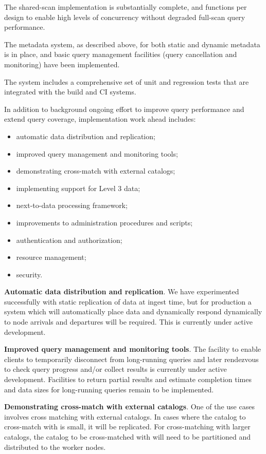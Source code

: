 \documentclass[DM,lsstdraft,toc]{lsstdoc}
\begin{document}
The shared-scan implementation is substantially complete, and functions per
design to enable high levels of concurrency without degraded full-scan query
performance.

The metadata system, as described above, for both static and dynamic metadata
is in place, and basic query management facilities (query cancellation and
monitoring) have been implemented.

The system includes a comprehensive set of unit and regression tests that are
integrated with the build and CI systems.

In addition to background ongoing effort to improve query performance and
extend query coverage, implementation work ahead includes:

\begin{itemize}
\item
  automatic data distribution and replication;
\item
  improved query management and monitoring tools;
\item
  demonstrating cross-match with external catalogs;
\item
  implementing support for Level 3 data;
\item
  next-to-data processing framework;
\item
  improvements to administration procedures and scripts;
\item
  authentication and authorization;
\item
  resource management;
\item
  security.
\end{itemize}

\textbf{Automatic data distribution and replication}. We have experimented
successfully with static replication of data at ingest time, but for
production a system which will automatically place data and dynamically
respond dynamically to node arrivals and departures will be required.
This is currently under active development.

\textbf{Improved query management and monitoring tools}. The facility to
enable clients to temporarily disconnect from long-running queries and later
rendezvous to check query progress and/or collect results is currently under
active development.  Facilities to return partial results and estimate
completion times and data sizes for long-running queries remain to be
implemented.

\textbf{Demonstrating cross-match with external catalogs}. One of the use
cases involves cross matching with external catalogs. In cases where the
catalog to cross-match with is small, it will be replicated. For
cross-matching with larger catalogs, the catalog to be cross-matched with
will need to be partitioned and distributed to the worker nodes.
\end{document}

